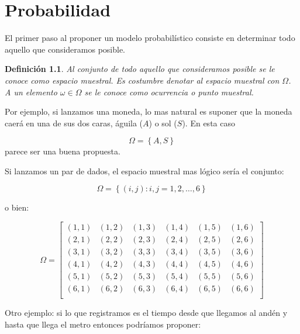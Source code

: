 \documentclass{extreport}
\theoremstyle{definicion}
\newtheorem{definition}{Definición}[chapter]
\theoremstyle{propiedad}
\begin{document}
\chapter{Probabilidad} 
    

\texttt{\the\parskip}

El primer paso al proponer un modelo probabilístico consiste en determinar todo aquello que consideramos posible. 

\begin{definition}
Al conjunto de todo aquello que consideramos \emph{posible} se le conoce  como \emph{espacio muestral}. Es costumbre denotar al espacio muestral con $\Omega$. A un elemento $\omega \in \Omega$ se le conoce como \emph{ocurrencia} o \emph{punto muestral}.
\end{definition}



Por ejemplo, si lanzamos una moneda, lo mas natural es suponer que la moneda caerá en una de sus dos caras, águila ($A$) o sol ($S$). En esta caso 

$$
\Omega =\left\{A, S\right\} 
$$
parece ser una buena propuesta. 

Si lanzamos un par de dados, el espacio muestral mas lógico sería el conjunto:

$$
\Omega = \left\{(i, j): i, j = 1,2,\ldots,6\right\}
$$

o bien:

$$
\Omega = \left[
\begin{matrix}
(1,1) & (1,2) & (1,3) & (1,4) & (1,5) & (1,6) \\

(2,1) & (2,2) & (2,3) & (2,4) & (2,5) & (2,6) \\

(3,1) & (3,2) & (3,3) & (3,4) & (3,5) & (3,6) \\

(4,1) & (4,2) & (4,3) & (4,4) & (4,5) & (4,6) \\

(5,1) & (5,2) & (5,3) & (5,4) & (5,5) & (5,6) \\

(6,1) & (6,2) & (6,3) & (6,4) & (6,5) & (6,6) \\

\end{matrix}
\right]
$$

Otro ejemplo: si lo que registramos es el tiempo desde que llegamos al andén y hasta que llega el metro entonces podríamos proponer:
\end{document}
